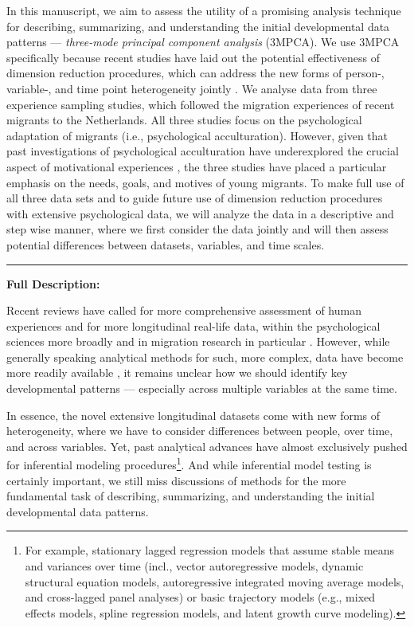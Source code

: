 \documentclass[]{article}
\let\rmarkdownfootnote\footnote%
\def\footnote{\protect\rmarkdownfootnote}
\begin{document}
In this manuscript, we aim to assess the utility of a promising analysis
technique for describing, summarizing, and understanding the initial
developmental data patterns ---
\textit{three-mode principal component analysis} (3MPCA). We use 3MPCA
specifically because recent studies have laid out the potential
effectiveness of dimension reduction procedures, which can address the
new forms of person-, variable-, and time point heterogeneity jointly
\citep[e.g.,][]{Monden2015}. We analyse data from three experience
sampling studies, which followed the migration experiences of recent
migrants to the Netherlands. All three studies focus on the
psychological adaptation of migrants (i.e., psychological
acculturation). However, given that past investigations of psychological
acculturation have underexplored the crucial aspect of motivational
experiences \citep{Kreienkamp2022d}, the three studies have placed a
particular emphasis on the needs, goals, and motives of young migrants.
To make full use of all three data sets and to guide future use of
dimension reduction procedures with extensive psychological data, we
will analyze the data in a descriptive and step wise manner, where we
first consider the data jointly and will then assess potential
differences between datasets, variables, and time scales.

\begin{center}\rule{0.5\linewidth}{0.5pt}\end{center}

\textbf{Full Description:}

Recent reviews have called for more comprehensive assessment of human
experiences and for more longitudinal real-life data, within the
psychological sciences more broadly and in migration research in
particular
\citep[e.g.,][]{Kreienkamp2022d, MacInnis2015, McKeown2017, Pettigrew2011, Ward2019}.
However, while generally speaking analytical methods for such, more
complex, data have become more readily available
\citep[e.g.,][]{ODonnell2021}, it remains unclear how we should identify
key developmental patterns --- especially across multiple variables at
the same time.

In essence, the novel extensive longitudinal datasets come with new
forms of heterogeneity, where we have to consider differences between
people, over time, and across variables. Yet, past analytical advances
have almost exclusively pushed for inferential modeling
procedures\footnote{For example, stationary lagged regression models
  that assume stable means and variances over time (incl., vector
  autoregressive models, dynamic structural equation models,
  autoregressive integrated moving average models, and cross-lagged
  panel analyses) or basic trajectory models (e.g., mixed effects
  models, spline regression models, and latent growth curve modeling).}.
And while inferential model testing is certainly important, we still
miss discussions of methods for the more fundamental task of describing,
summarizing, and understanding the initial developmental data patterns.
\end{document}

